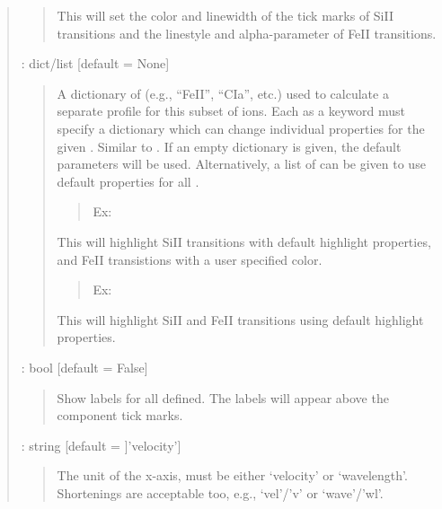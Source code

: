 \documentclass[letterpaper,10pt,english]{sphinxmanual}
\begin{document}
\begin{fulllineitems}
\begin{quote}
\begin{description}
\begin{quote}
\begin{quote}
\begin{description}
\end{description}
\end{quote}

This will set the color and linewidth of the tick marks
of SiII transitions and the linestyle and alpha-parameter
of FeII transitions.
\end{quote}

 : dict/list   {[}default = None{]}
\begin{quote}

A dictionary of  (e.g., “FeII”, “CIa”, etc.) used to calculate
a separate profile for this subset of ions. Each  as a keyword
must specify a dictionary which can change individual properties for
the given . Similar to .
If an empty dictionary is given, the default parameters will be used.
Alternatively, a list of  can be given to use default properties
for all .
\begin{quote}

Ex: 
\end{quote}

This will highlight SiII transitions with default highlight
properties, and FeII transistions with a user specified color.
\begin{quote}

Ex: 
\end{quote}

This will highlight SiII and FeII transitions using default
highlight properties.
\end{quote}

 : bool   {[}default = False{]}
\begin{quote}

Show labels for all  defined.
The labels will appear above the component tick marks.
\end{quote}

 : string   {[}default = {]}’velocity’{]}
\begin{quote}

The unit of the x-axis, must be either ‘velocity’ or ‘wavelength’.
Shortenings are acceptable too, e.g., ‘vel’/’v’ or ‘wave’/’wl’.
\end{quote}

\end{description}\end{quote}

\end{fulllineitems}
\end{document}

